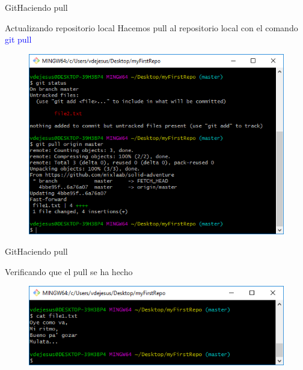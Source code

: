 \documentclass[10pt]{beamer}
\begin{document}
\begin{frame}{Git}{Haciendo pull}

\begin{block}{Actualizando repositorio local}
Hacemos pull al repositorio local con el comando \textcolor{blue}{git pull}

\begin{figure}[h!]
\centering
\includegraphics [scale=0.5]{step11}
\label{fig:gitstatus}
\end{figure}

\end{block}

\end{frame}

\begin{frame}{Git}{Haciendo pull}

\begin{block}{Verificando que el pull se ha hecho}

\begin{figure}[h!]
\centering
\includegraphics [scale=0.5]{step12}
\label{fig:gitstatus}
\end{figure}

\end{block}

\end{frame}
\end{document}
